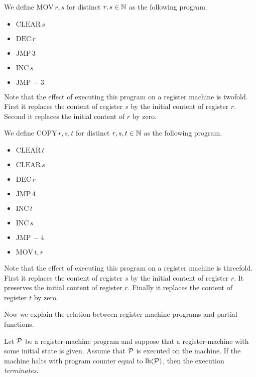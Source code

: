 \documentclass[10pt]{amsart}
\begin{document}
\begin{example}\label{example:move_register_program}
	We define $\mathrm{MOV}\,r,s$ for distinct $r,s \in {\mathbb N}$ as the following program.
	\begin{itemize}
		\item[] $\mathrm{CLEAR}\,s$
		\item[] $\mathrm{DEC}\,r$
		\item[] $\mathrm{JMP}\,3$
		\item[] $\mathrm{INC}\,s$
		\item[] $\mathrm{JMP}\,-3$
	\end{itemize}
	Note that the effect of executing this program on a register machine is twofold. First it replaces the content of register $s$ by the initial content of register $r$. Second it replaces the initial content of $r$ by zero.
\end{example}

\begin{example}\label{example:copy_with_temp_program}
	We define $\mathrm{COPY}\,r,s,t$ for distinct $r,s,t\in {\mathbb N}$ as the following program.
	\begin{itemize}
		\item[] $\mathrm{CLEAR}\,t$
		\item[] $\mathrm{CLEAR}\,s$
		\item[] $\mathrm{DEC}\,r$
		\item[] $\mathrm{JMP}\,4$
		\item[] $\mathrm{INC}\,t$
		\item[]	$\mathrm{INC}\,s$
		\item[] $\mathrm{JMP}\,-4$
		\item[]	$\mathrm{MOV}\,t,r$
	\end{itemize}
	Note that the effect of executing this program on a register machine is threefold. First it replaces the content of register $s$ by the initial content of register $r$. It preserves the initial content of register $r$. Finally it replaces the content of register $t$ by zero.
\end{example}
\noindent
Now we explain the relation between register-machine programs and partial functions.

\begin{definition}
	Let ${\mathcal P}$ be a register-machine program and suppose that a register-machine with some initial state is given. Assume that ${\mathcal P}$ is executed on the machine. If the machine halts with program counter equal to $\mathrm{lh}({\mathcal P})$, then the execution \textit{terminates}.
\end{definition}
\end{document}
